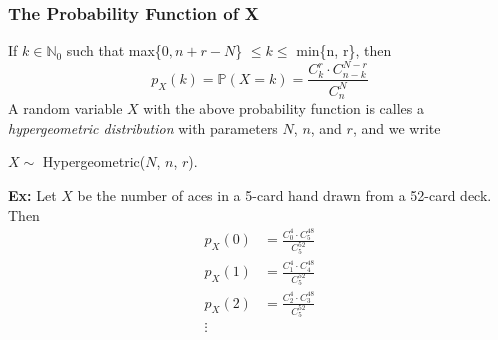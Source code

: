 \documentclass{article}
\newcommand{\ti}[1]{\textit{#1}}
\newcommand{\N}{\mathbb{N}}
\newcommand{\bbP}{\mathbb{P}}
\newcommand{\x}{\cdot}
\begin{document}
\subsubsection{The Probability Function of X}
If $k \in \N_{0}$ such that max\{$0, n+r-N$\} $\leq k \leq$ min\{n, r\}, then
\[p_{X}(k) = \bbP(X=k) = \frac{C_{k}^{r}\x C_{n-k}^{N-r}}{C_{n}^{N}}\]
A random variable $X$ with the above probability function is calles a \ti{hypergeometric distribution} with parameters $N$, $n$, and $r$, and we write 
\begin{center}
$X \sim$ Hypergeometric($N$, $n$, $r$).
\end{center}
\textbf{Ex:} Let $X$ be the number of aces in a 5-card hand drawn from a 52-card deck. Then
\begin{align*}
	p_X(0) &= \frac{C_{0}^{4}\x C_{5}^{48}}{C_{5}^{52}}\\
	p_X(1) &= \frac{C_{1}^{4}\x C_{4}^{48}}{C_{5}^{52}}\\
	p_X(2) &= \frac{C_{2}^{4}\x C_{3}^{48}}{C_{5}^{52}}\\
	\vdots
\end{align*}
\end{document}
